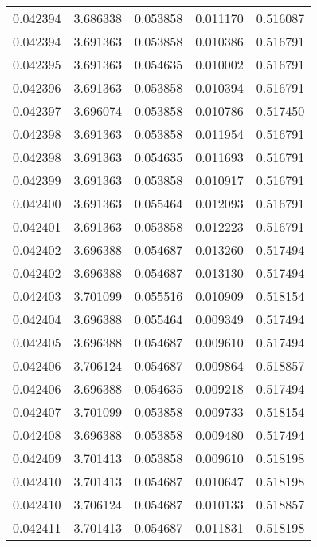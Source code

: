 \begin{tabular}{lrrrr}
0.042394    &  3.686338 &  0.053858 &  0.011170 &             0.516087 \\
0.042394    &  3.691363 &  0.053858 &  0.010386 &             0.516791 \\
0.042395    &  3.691363 &  0.054635 &  0.010002 &             0.516791 \\
0.042396    &  3.691363 &  0.053858 &  0.010394 &             0.516791 \\
0.042397    &  3.696074 &  0.053858 &  0.010786 &             0.517450 \\
0.042398    &  3.691363 &  0.053858 &  0.011954 &             0.516791 \\
0.042398    &  3.691363 &  0.054635 &  0.011693 &             0.516791 \\
0.042399    &  3.691363 &  0.053858 &  0.010917 &             0.516791 \\
0.042400    &  3.691363 &  0.055464 &  0.012093 &             0.516791 \\
0.042401    &  3.691363 &  0.053858 &  0.012223 &             0.516791 \\
0.042402    &  3.696388 &  0.054687 &  0.013260 &             0.517494 \\
0.042402    &  3.696388 &  0.054687 &  0.013130 &             0.517494 \\
0.042403    &  3.701099 &  0.055516 &  0.010909 &             0.518154 \\
0.042404    &  3.696388 &  0.055464 &  0.009349 &             0.517494 \\
0.042405    &  3.696388 &  0.054687 &  0.009610 &             0.517494 \\
0.042406    &  3.706124 &  0.054687 &  0.009864 &             0.518857 \\
0.042406    &  3.696388 &  0.054635 &  0.009218 &             0.517494 \\
0.042407    &  3.701099 &  0.053858 &  0.009733 &             0.518154 \\
0.042408    &  3.696388 &  0.053858 &  0.009480 &             0.517494 \\
0.042409    &  3.701413 &  0.053858 &  0.009610 &             0.518198 \\
0.042410    &  3.701413 &  0.054687 &  0.010647 &             0.518198 \\
0.042410    &  3.706124 &  0.054687 &  0.010133 &             0.518857 \\
0.042411    &  3.701413 &  0.054687 &  0.011831 &             0.518198 \\

\end{tabular}

